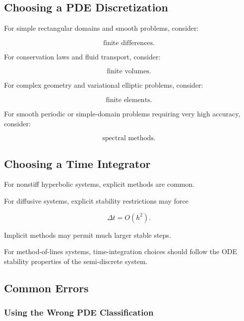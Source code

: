 \subsection{Choosing a PDE Discretization}
\label{subsec:choosing-pde-discretization}

For simple rectangular domains and smooth problems, consider:

\[
\boxed{
\text{finite differences}.
}
\]

For conservation laws and fluid transport, consider:

\[
\boxed{
\text{finite volumes}.
}
\]

For complex geometry and variational elliptic problems, consider:

\[
\boxed{
\text{finite elements}.
}
\]

For smooth periodic or simple-domain problems requiring very high
accuracy, consider:

\[
\boxed{
\text{spectral methods}.
}
\]

\subsection{Choosing a Time Integrator}
\label{subsec:choosing-pde-time-integrator}

For nonstiff hyperbolic systems, explicit methods are common.

For diffusive systems, explicit stability restrictions may force

\[
\boxed{
\Delta t=O(h^2).
}
\]

Implicit methods may permit much larger stable steps.

For method-of-lines systems, time-integration choices should follow the
ODE stability properties of the semi-discrete system.

\subsection{Common Errors}
\label{subsec:numerical-pde-common-errors}

\subsubsection{Using the Wrong PDE Classification}

